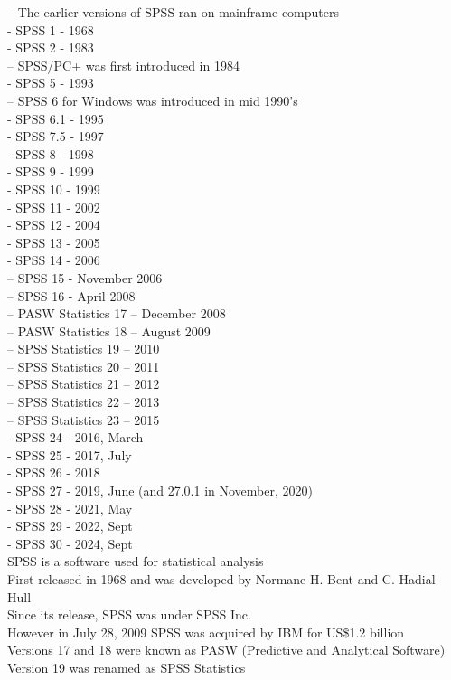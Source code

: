 \documentclass[
  letterpaper,
  DIV=11,
  numbers=noendperiod]{scrreprt}
\begin{document}
-- The earlier versions of SPSS ran on mainframe computers\\
- SPSS 1 - 1968\\
- SPSS 2 - 1983\\
-- SPSS/PC+ was first introduced in 1984\\
- SPSS 5 - 1993\\
-- SPSS 6 for Windows was introduced in mid 1990's\\
- SPSS 6.1 - 1995\\
- SPSS 7.5 - 1997\\
- SPSS 8 - 1998\\
- SPSS 9 - 1999\\
- SPSS 10 - 1999\\
- SPSS 11 - 2002\\
- SPSS 12 - 2004\\
- SPSS 13 - 2005\\
- SPSS 14 - 2006\\
-- SPSS 15 - November 2006\\
-- SPSS 16 - April 2008\\
-- PASW Statistics 17 -- December 2008\\
-- PASW Statistics 18 -- August 2009\\
-- SPSS Statistics 19 -- 2010\\
-- SPSS Statistics 20 -- 2011\\
-- SPSS Statistics 21 -- 2012\\
-- SPSS Statistics 22 -- 2013\\
-- SPSS Statistics 23 -- 2015\\
- SPSS 24 - 2016, March\\
- SPSS 25 - 2017, July\\
- SPSS 26 - 2018\\
- SPSS 27 - 2019, June (and 27.0.1 in November, 2020)\\
- SPSS 28 - 2021, May\\
- SPSS 29 - 2022, Sept\\
- SPSS 30 - 2024, Sept\\

SPSS is a software used for statistical analysis\\
First released in 1968 and was developed by Normane H. Bent and C.
Hadial Hull\\
Since its release, SPSS was under SPSS Inc.\\
However in July 28, 2009 SPSS was acquired by IBM for US\$1.2 billion\\
Versions 17 and 18 were known as PASW (Predictive and Analytical
Software)\\
Version 19 was renamed as SPSS Statistics\\
\end{document}
